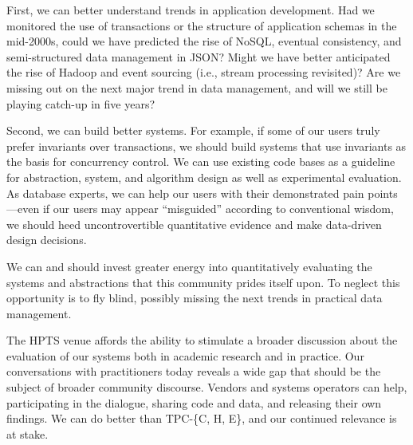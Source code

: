 First, we can better understand trends in application development. Had we monitored the use of transactions or the structure of application schemas in the mid-2000s, could we have predicted the rise of NoSQL, eventual consistency, and semi-structured data management in JSON? Might we have better anticipated the rise of Hadoop and event sourcing (i.e., stream processing revisited)? Are we missing out on the next major trend in data management, and will we still be playing catch-up in five years?

Second, we can build better systems. For example, if some of our users truly prefer invariants over transactions, we should build systems that use invariants as the basis for concurrency control. We can use existing code bases as a guideline for abstraction, system, and algorithm design as well as experimental evaluation. As database experts, we can help our users with their demonstrated pain points---even if our users may appear ``misguided'' according to conventional wisdom, we should heed uncontrovertible quantitative evidence and make data-driven design decisions.



 We can and should invest greater energy into quantitatively evaluating the systems and abstractions that this community prides itself upon. To neglect this opportunity is to fly blind, possibly missing the next trends in practical data management.

 The HPTS venue affords the ability to stimulate a broader discussion about the evaluation of our systems both in academic research and in practice. Our conversations with practitioners today reveals a wide gap that should be the subject of broader community discourse. Vendors and systems operators can help, participating in the dialogue, sharing code and data, and releasing their own findings. We can do better than TPC-\{C, H, E\}, and our continued relevance is at stake.